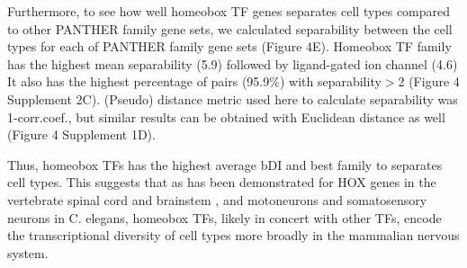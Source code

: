 Furthermore, to see how well homeobox TF genes separates cell types compared to other PANTHER family gene sets, 
we calculated separability between the cell types for each of PANTHER family gene sets (Figure 4E). Homeobox TF family has the highest mean separability (5.9) followed by ligand-gated ion channel (4.6) It also has the highest percentage of pairs (95.9\%) with separability$>$2 (Figure 4 Supplement 2C). (Pseudo) distance metric used here to calculate separability was 1-corr.coef., but similar results can be obtained with Euclidean distance as well (Figure 4 Supplement 1D). 

Thus, homeobox TFs has the highest average bDI and best family to separates cell types. This suggests that as has been demonstrated for HOX genes in the vertebrate spinal cord and brainstem \cite{Dasen_2009,Philippidou_2013}, and motoneurons \cite{Kratsios_2017} and somatosensory neurons \cite{Zheng_2015} in C. elegans, homeobox TFs, likely in concert with other TFs, encode the transcriptional diversity of cell types more broadly in the mammalian nervous system.
